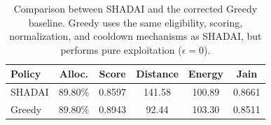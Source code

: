 \begin{table}[t]
\centering
\caption{Comparison between SHADAI and the corrected Greedy baseline. Greedy uses the same eligibility, scoring, normalization, and cooldown mechanisms as SHADAI, but performs pure exploitation ($\epsilon=0$).}
\label{tab:c22_greedy}
\begin{tabular}{lccccc}
\hline
Policy & Alloc. & Score & Distance & Energy & Jain \\
\hline
SHADAI & 89.80\% & 0.8597 & 141.58 & 100.89 & 0.8661 \\
Greedy & 89.80\% & 0.8943 & 92.44 & 103.30 & 0.8511 \\
\hline
\end{tabular}
\end{table}